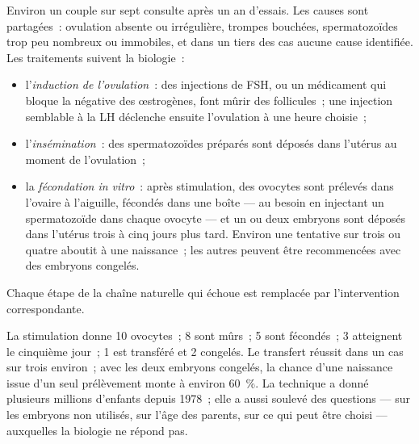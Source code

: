 \begin{proposition}\label{prop:g11:hormones-and-reproduction:art}
Environ un couple sur sept consulte après un an d'essais. Les causes
sont partagées~: ovulation absente ou irrégulière, trompes bouchées,
spermatozoïdes trop peu nombreux ou immobiles, et dans un tiers des cas
aucune cause identifiée. Les traitements suivent la biologie~:
\begin{itemize}
  \item l'\emph{induction de l'ovulation}~: des injections de FSH, ou
        un médicament qui bloque la  négative des
        œstrogènes, font mûrir des follicules~; une injection
        semblable à la LH déclenche ensuite l'ovulation à une heure
        choisie~;
  \item l'\emph{insémination}~: des spermatozoïdes préparés sont
        déposés dans l'utérus au moment de l'ovulation~;
  \item la \emph{fécondation in vitro}~: après stimulation, des
        ovocytes sont prélevés dans l'ovaire à l'aiguille, fécondés
        dans une boîte --- au besoin en injectant un spermatozoïde dans
        chaque ovocyte --- et un ou deux embryons sont déposés dans
        l'utérus trois à cinq jours plus tard. Environ une tentative
        sur trois ou quatre aboutit à une naissance~; les autres
        peuvent être recommencées avec des embryons congelés.
\end{itemize}
Chaque étape de la chaîne naturelle qui échoue est remplacée par
l'intervention correspondante.
\end{proposition}
\admitted

\begin{example}\label{ex:g11:hormones-and-reproduction:ivf}
La stimulation donne 10 ovocytes~; 8 sont mûrs~; 5 sont fécondés~; 3
atteignent le cinquième jour~; 1 est transféré et 2 congelés. Le
transfert réussit dans un cas sur trois environ~; avec les deux
embryons congelés, la chance d'une naissance issue d'un seul
prélèvement monte à environ 60~\%. La technique a donné plusieurs
millions d'enfants depuis 1978~; elle a aussi soulevé des questions ---
sur les embryons non utilisés, sur l'âge des parents, sur ce qui peut
être choisi --- auxquelles la biologie ne répond pas.
\end{example}

